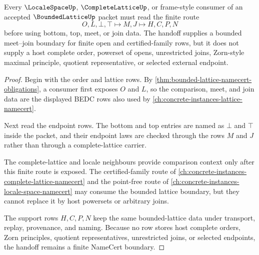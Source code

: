 \begin{theorem}
\label{thm:bounded-lattice-locale-handoff}
Every $\LocaleSpaceUp$, $\CompleteLatticeUp$, or frame-style consumer of an accepted $\BoundedLatticeUp$ packet must read the finite route
$$
O,L,\bot,\top \longmapsto M,J \longmapsto H,C,P,N
$$
before using bottom, top, meet, or join data. The handoff supplies a bounded meet--join boundary for finite open and certified-family rows, but it does not supply a host complete order, powerset of opens, unrestricted joins, Zorn-style maximal principle, quotient representative, or selected external endpoint.
\end{theorem}
\begin{proof}
Begin with the order and lattice rows. By \autoref{thm:bounded-lattice-namecert-obligations}, a consumer first exposes $O$ and $L$, so the comparison, meet, and join data are the displayed BEDC rows also used by \autoref{ch:concrete-instances-lattice-namecert}.

Next read the endpoint rows. The bottom and top entries are named as $\bot$ and $\top$ inside the packet, and their endpoint laws are checked through the rows $M$ and $J$ rather than through a complete-lattice carrier.

The complete-lattice and locale neighbours provide comparison context only after this finite route is exposed. The certified-family route of \autoref{ch:concrete-instances-complete-lattice-namecert} and the point-free route of \autoref{ch:concrete-instances-locale-space-namecert} may consume the bounded lattice boundary, but they cannot replace it by host powersets or arbitrary joins.

The support rows $H,C,P,N$ keep the same bounded-lattice data under transport, replay, provenance, and naming. Because no row stores host complete orders, Zorn principles, quotient representatives, unrestricted joins, or selected endpoints, the handoff remains a finite NameCert boundary.
\end{proof}



